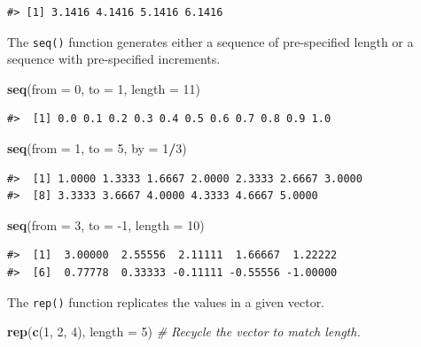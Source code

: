 \documentclass[
  11pt,
]{krantz}
\newenvironment{Shaded}{\begin{snugshade}}{\end{snugshade}}
\newcommand{\CommentTok}[1]{\textcolor[rgb]{0.56,0.35,0.01}{\textit{#1}}}
\newcommand{\DataTypeTok}[1]{\textcolor[rgb]{0.13,0.29,0.53}{#1}}
\newcommand{\DecValTok}[1]{\textcolor[rgb]{0.00,0.00,0.81}{#1}}
\newcommand{\KeywordTok}[1]{\textcolor[rgb]{0.13,0.29,0.53}{\textbf{#1}}}
\newcommand{\NormalTok}[1]{#1}
\newcommand{\OperatorTok}[1]{\textcolor[rgb]{0.81,0.36,0.00}{\textbf{#1}}}
\theoremstyle{definition}
\theoremstyle{definition}
\theoremstyle{definition}
\theoremstyle{definition}
\theoremstyle{remark}
\begin{document}
\begin{verbatim}
#> [1] 3.1416 4.1416 5.1416 6.1416
\end{verbatim}

The \texttt{seq()} function generates either a sequence of pre-specified length or a sequence with pre-specified increments.

\begin{Shaded}
\begin{Highlighting}[]
\KeywordTok{seq}\NormalTok{(}\DataTypeTok{from =} \DecValTok{0}\NormalTok{, }\DataTypeTok{to =} \DecValTok{1}\NormalTok{, }\DataTypeTok{length =} \DecValTok{11}\NormalTok{)}
\end{Highlighting}
\end{Shaded}

\begin{verbatim}
#>  [1] 0.0 0.1 0.2 0.3 0.4 0.5 0.6 0.7 0.8 0.9 1.0
\end{verbatim}

\begin{Shaded}
\begin{Highlighting}[]
\KeywordTok{seq}\NormalTok{(}\DataTypeTok{from =} \DecValTok{1}\NormalTok{, }\DataTypeTok{to =} \DecValTok{5}\NormalTok{, }\DataTypeTok{by =} \DecValTok{1}\OperatorTok{/}\DecValTok{3}\NormalTok{)}
\end{Highlighting}
\end{Shaded}

\begin{verbatim}
#>  [1] 1.0000 1.3333 1.6667 2.0000 2.3333 2.6667 3.0000
#>  [8] 3.3333 3.6667 4.0000 4.3333 4.6667 5.0000
\end{verbatim}

\begin{Shaded}
\begin{Highlighting}[]
\KeywordTok{seq}\NormalTok{(}\DataTypeTok{from =} \DecValTok{3}\NormalTok{, }\DataTypeTok{to =} \DecValTok{{-}1}\NormalTok{, }\DataTypeTok{length =} \DecValTok{10}\NormalTok{)}
\end{Highlighting}
\end{Shaded}

\begin{verbatim}
#>  [1]  3.00000  2.55556  2.11111  1.66667  1.22222
#>  [6]  0.77778  0.33333 -0.11111 -0.55556 -1.00000
\end{verbatim}

The \texttt{rep()} function replicates the values in a given vector.

\begin{Shaded}
\begin{Highlighting}[]
\KeywordTok{rep}\NormalTok{(}\KeywordTok{c}\NormalTok{(}\DecValTok{1}\NormalTok{, }\DecValTok{2}\NormalTok{, }\DecValTok{4}\NormalTok{), }\DataTypeTok{length =} \DecValTok{5}\NormalTok{) }\CommentTok{\# Recycle the vector to match length.}
\end{Highlighting}
\end{Shaded}
\end{document}
